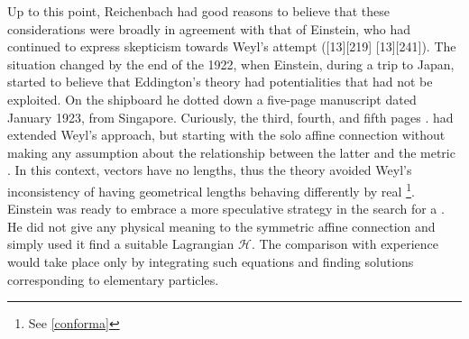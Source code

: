 \documentclass[draft]{article}
\begin{document}
Up to this point, Reichenbach had good reasons to believe that these considerations were broadly in agreement with that of Einstein, who had continued to express skepticism towards Weyl's attempt ([13][219] [13][241]). The situation changed by the end of the 1922, when Einstein, during a trip to Japan, started to believe that Eddington's theory had potentialities that had not be exploited. On the shipboard he dotted down a five-page manuscript dated January 1923, from Singapore. Curiously, the third, fourth, and fifth pages  \citep{Reichenbach1921}. \citet{Eddington1921} had extended Weyl's approach, but starting with the solo affine connection \Gtmn without making any assumption about the relationship between the latter and the metric \gmn. In this context, vectors have no lengths, thus the theory avoided Weyl's inconsistency of having geometrical lengths behaving differently by real \rac\footnote{See \cref{conforma}}. Einstein was ready to embrace a more speculative strategy in the search for a \uft. He did not give any physical meaning to the symmetric affine connection \Gtmn and simply used it find a suitable Lagrangian $\mathcal{H}$. The comparison with experience would take place only \apo by integrating such equations and finding solutions corresponding to elementary particles.



\end{document}
